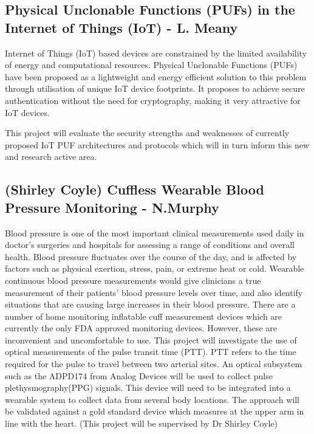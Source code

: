 \documentclass[a4paper]{article}
\begin{document}
\subsection{Physical Unclonable Functions (PUFs) in the Internet of Things (IoT)
- L. Meany}

Internet of Things (IoT) based devices are constrained by the limited availability of energy and computational resources. Physical Unclonable Functions (PUFs) have been proposed as a lightweight and energy efficient solution to this problem through utilisation of unique IoT device footprints. It proposes to achieve secure authentication without the need for cryptography, making it very attractive for IoT devices.

This project will evaluate the security strengths and weaknesses of currently proposed IoT PUF architectures and protocols which will in turn inform this new and research active area.

\subsection{(Shirley Coyle) Cuffless Wearable Blood Pressure Monitoring -
N.Murphy}

Blood pressure is one of the most important clinical measurements used daily in doctor’s surgeries and hospitals for assessing a range of conditions and overall health. Blood pressure fluctuates over the course of the day, and is affected by factors such as physical exertion, stress, pain, or extreme heat or cold. Wearable continuous blood pressure measurements would give clinicians a true measurement of their patients’ blood pressure levels over time, and also identify situations that are causing large increases in their blood pressure. There are a number of home monitoring inflatable cuff measurement devices which are currently the only FDA approved monitoring devices. However, these are inconvenient and uncomfortable to use. This project will investigate the use of optical measurements of the pulse transit time (PTT). PTT refers to the time required for the pulse to travel between two arterial sites. An optical subsystem such as the ADPD174 from Analog Devices will be used to collect pulse plethysmography(PPG) signals. This device will need to be integrated into a wearable system to collect data from several body locations. The approach will be validated against a gold standard device which measures at the upper arm in line with the heart. (This project will be supervised by Dr Shirley Coyle)
\end{document}
